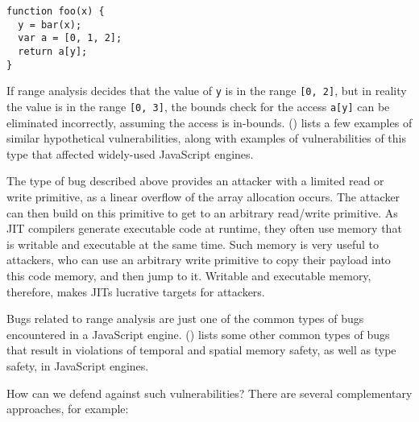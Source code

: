 \documentclass[
  a4paper,
]{report}
\begin{document}
\begin{verbatim}
function foo(x) {
  y = bar(x);
  var a = [0, 1, 2];
  return a[y];
}
\end{verbatim}

If range analysis decides that the value of \texttt{y} is in the range
\texttt{{[}0,\ 2{]}}, but in reality the value is in the range
\texttt{{[}0,\ 3{]}}, the bounds check for the access \texttt{a{[}y{]}}
can be eliminated incorrectly, assuming the access is in-bounds.
() lists a few examples of
similar hypothetical vulnerabilities, along with examples of
vulnerabilities of this type that affected widely-used JavaScript
engines.

The type of bug described above provides an attacker with a limited read
or write primitive, as a linear overflow of the array allocation occurs.
The attacker can then build on this primitive to get to an arbitrary
read/write primitive. As JIT compilers generate executable code at
runtime, they often use memory that is writable and executable at the
same time. Such memory is very useful to attackers, who can use an
arbitrary write primitive to copy their payload into this code memory,
and then jump to it. Writable and executable memory, therefore, makes
JITs lucrative targets for attackers.

Bugs related to range analysis are just one of the common types of bugs
encountered in a JavaScript engine. () lists some other common types of bugs that result in
violations of temporal and spatial memory safety, as well as type
safety, in JavaScript engines.

How can we defend against such vulnerabilities? There are several
complementary approaches, for example:
\end{document}
